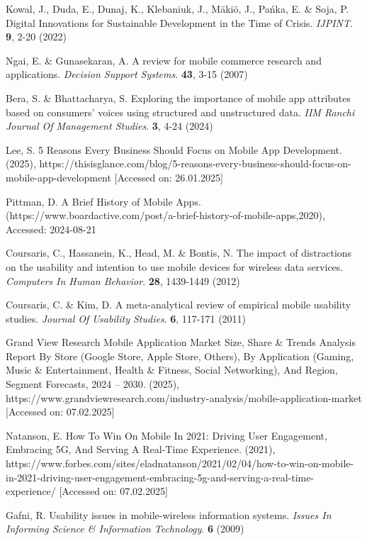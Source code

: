 \documentclass[preprint,12pt,number]{elsarticle}
\begin{document}
\begin{thebibliography}{00}
Kowal, J., Duda, E., Dunaj, K., Klebaniuk, J., Mäkiö, J., Pańka, E. \& Soja, P. Digital Innovations for Sustainable Development in the Time of Crisis. {\em IJPINT}. \textbf{9}, 2-20 (2022)

Ngai, E. \& Gunasekaran, A. A review for mobile commerce research and applications. {\em Decision Support Systems}. \textbf{43}, 3-15 (2007)

Bera, S. \& Bhattacharya, S. Exploring the importance of mobile app attributes based on consumers' voices using structured and unstructured data. {\em IIM Ranchi Journal Of Management Studies}. \textbf{3}, 4-24 (2024)

Lee, S. 5 Reasons Every Business Should Focus on Mobile App Development.  (2025), https://thisisglance.com/blog/5-reasons-every-business-should-focus-on-mobile-app-development [Accessed on: 26.01.2025]

Pittman, D. A Brief History of Mobile Apps. (https://www.boardactive.com/post/a-brief-history-of-mobile-apps,2020), Accessed: 2024-08-21

Coursaris, C., Hassanein, K., Head, M. \& Bontis, N. The impact of distractions on the usability and intention to use mobile devices for wireless data services. {\em Computers In Human Behavior}. \textbf{28}, 1439-1449 (2012)

Coursaris, C. \& Kim, D. A meta-analytical review of empirical mobile usability studies. {\em Journal Of Usability Studies}. \textbf{6}, 117-171 (2011)       

Grand View Research Mobile Application Market Size, Share \& Trends Analysis Report By Store (Google Store, Apple Store, Others), By Application (Gaming, Music \& Entertainment, Health \& Fitness, Social Networking), And Region, Segment Forecasts, 2024 – 2030.  (2025), https://www.grandviewresearch.com/industry-analysis/mobile-application-market [Accessed on: 07.02.2025]

Natanson, E. How To Win On Mobile In 2021: Driving User Engagement, Embracing 5G, And Serving A Real-Time Experience.  (2021), https://www.forbes.com/sites/eladnatanson/2021/02/04/how-to-win-on-mobile-in-2021-driving-user-engagement-embracing-5g-and-serving-a-real-time-experience/ [Accessed on: 07.02.2025]

Gafni, R. Usability issues in mobile-wireless information systems. {\em Issues In Informing Science \& Information Technology}. \textbf{6} (2009)


\end{thebibliography}
\end{document}
